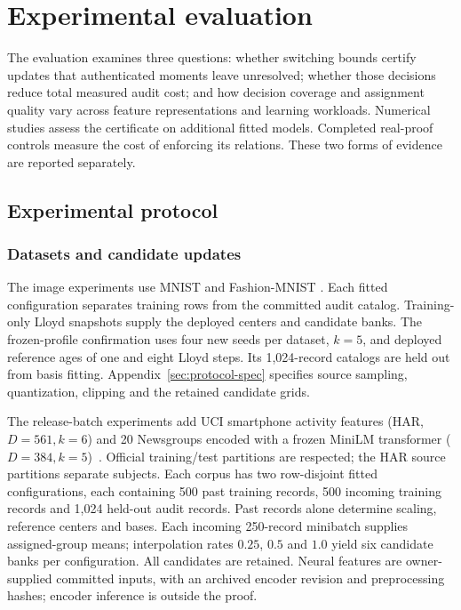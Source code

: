 \section{Experimental evaluation}\label{sec:evaluation}
The evaluation examines three questions: whether switching bounds certify
updates that authenticated moments leave unresolved; whether those decisions
reduce total measured audit cost; and how decision coverage and assignment
quality vary across feature representations and learning workloads.
Numerical studies assess the certificate on additional fitted models.
Completed real-proof controls measure the cost of enforcing its relations.
These two forms of evidence are reported separately.

\subsection{Experimental protocol}
\subsubsection{Datasets and candidate updates}
The image experiments use MNIST and Fashion-MNIST
\cite{lecun1998,fashion2017}. Each fitted configuration separates training
rows from the committed audit catalog. Training-only Lloyd snapshots supply
the deployed centers and candidate banks. The frozen-profile confirmation
uses four new seeds per dataset, $k=5$, and deployed reference ages of one
and eight Lloyd steps. Its 1,024-record catalogs are held out from basis
fitting. Appendix~\ref{sec:protocol-spec} specifies source sampling,
quantization, clipping and the retained candidate grids.

The release-batch experiments add UCI smartphone activity features
(HAR, $D=561,k=6$) and 20 Newsgroups encoded with a frozen MiniLM transformer
($D=384,k=5$)~\cite{ucihar2012,news20data,minilmcard2026}. Official
training/test partitions are respected; the HAR source partitions separate
subjects. Each corpus has two row-disjoint fitted configurations, each
containing 500 past training records, 500 incoming training records and
1,024 held-out audit records. Past records alone determine scaling,
reference centers and bases. Each incoming 250-record minibatch supplies
assigned-group means; interpolation rates $0.25$, $0.5$ and $1.0$ yield six
candidate banks per configuration. All candidates are retained. Neural
features are owner-supplied committed inputs, with an archived encoder
revision and preprocessing hashes; encoder inference is outside the proof.

